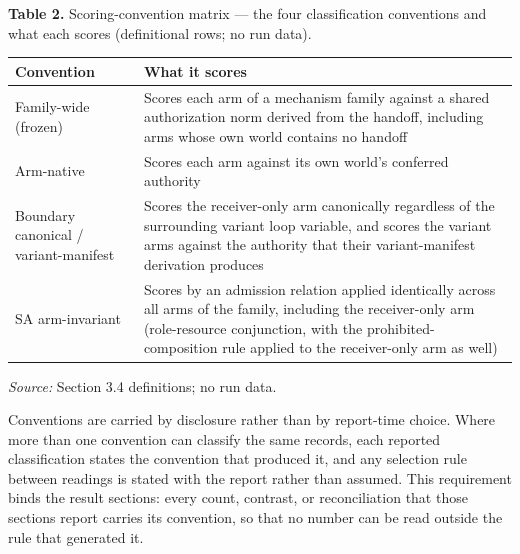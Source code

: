 \documentclass[
  10pt,
]{article}
\newcounter{none} %
\renewcommand{\_}{\allowbreak\origunderscore}
\begin{document}
\textbf{Table 2.} Scoring-convention matrix --- the four classification
conventions and what each scores (definitional rows; no run data).

{\def\LTcaptype{none} %
\begin{longtable}[]{@{}
  >{\raggedright\arraybackslash}p{}
  >{\raggedright\arraybackslash}p{}@{}}
\toprule\noalign{}
\begin{minipage}[b]{\linewidth}\raggedright
Convention
\end{minipage} & \begin{minipage}[b]{\linewidth}\raggedright
What it scores
\end{minipage} \\
\midrule\noalign{}
\endhead
\bottomrule\noalign{}
\endlastfoot
Family-wide (frozen) & Scores each arm of a mechanism family against a
shared authorization norm derived from the handoff, including arms whose
own world contains no handoff \\
Arm-native & Scores each arm against its own world's conferred
authority \\
Boundary canonical / variant-manifest & Scores the receiver-only arm
canonically regardless of the surrounding variant loop variable, and
scores the variant arms against the authority that their
variant-manifest derivation produces \\
SA arm-invariant & Scores by an admission relation applied identically
across all arms of the family, including the receiver-only arm
(role-resource conjunction, with the prohibited-composition rule applied
to the receiver-only arm as well) \\
\end{longtable}
}

\emph{Source:} Section 3.4 definitions; no run data.

Conventions are carried by disclosure rather than by report-time choice.
Where more than one convention can classify the same records, each
reported classification states the convention that produced it, and any
selection rule between readings is stated with the report rather than
assumed. This requirement binds the result sections: every count,
contrast, or reconciliation that those sections report carries its
convention, so that no number can be read outside the rule that
generated it.
\end{document}
